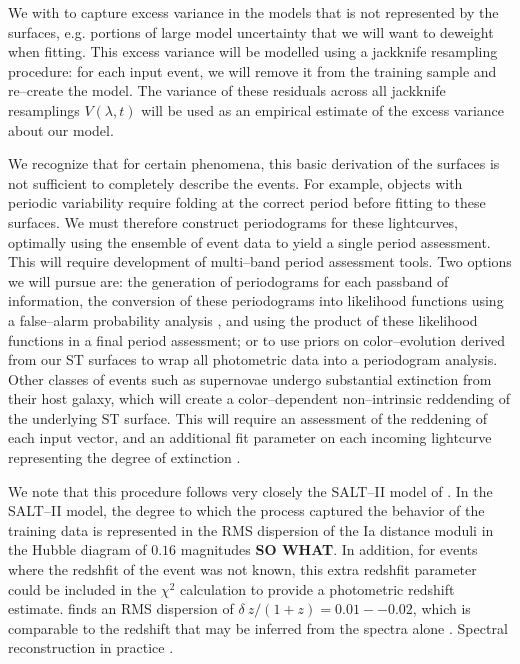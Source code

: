  We with to capture excess
variance in the models that is not represented by the surfaces, e.g. portions of
large model uncertainty that we will want to deweight when fitting.  This excess
variance will be modelled using a jackknife resampling procedure: for each input
event, we will remove it from the training sample and re--create the model.  The
variance of these residuals across all jackknife resamplings $V(\lambda, t)$
will be used as an empirical estimate of the excess variance about our model.

 We recognize that for certain
phenomena, this basic derivation of the surfaces is not sufficient to completely
describe the events. For example, objects with periodic variability require
folding at the correct period before fitting to these surfaces.  We must
therefore construct periodograms for these lightcurves, optimally using the
ensemble of event data to yield a single period assessment.  This will require
development of multi--band period assessment tools.  Two options we will pursue
are: the generation of periodograms for each passband of information, the
conversion of these periodograms into likelihood functions using a false--alarm
probability analysis \citep[e.g.][and references therein]{2009A&A...496..577Z},
and using the product of these likelihood functions in a final period
assessment; or to use priors on color--evolution derived from our ST surfaces to
wrap all photometric data into a periodogram analysis.  Other classes of events
such as supernovae undergo substantial extinction from their host galaxy, which
will create a color--dependent non--intrinsic reddending of the underlying ST
surface.  This will require an assessment of the reddening of each input vector,
and an additional fit parameter on each incoming lightcurve representing the
degree of extinction \cite[Equation 1][]{2007A&A...466...11G}.

 We note that this procedure follows very closely
the SALT--II model of \cite{2007A&A...466...11G}.  In the SALT--II model, the
degree to which the process captured the behavior of the training data is
represented in the RMS dispersion of the Ia distance moduli in the Hubble
diagram of $0.16$ magnitudes {\bf SO WHAT}.  In addition, for events where the
redshfit of the event was not known, this extra redshfit parameter could be
included in the $\chi^2$ calculation to provide a photometric redshift estimate.
\cite{2007A&A...466...11G} finds an RMS dispersion of $\delta~z/(1 + z) =
0.01--0.02$, which is comparable to the redshift that may be inferred from the
spectra alone \citep[see also][]{2010ApJ...717...40K}. Spectral reconstruction
in practice \citep{2010ApJ...719.1759A}.

